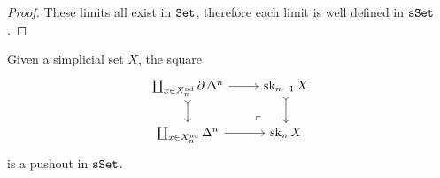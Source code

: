 \begin{proof}
    These limits all exist in \({\texttt{Set}}\), therefore each limit is well defined in
    \({\texttt{sSet}}\).
\end{proof}

\begin{proposition}
    \label{prop:filtration-attaching-cells}
    Given a simplicial set \(X\), the square
    \[
        \begin{tikzcd}
            \coprod_{x \in X_n^{\Nondeg}} \Bd \Delta^n
            \ar[rd, phantom, very near end, "\ulcorner"]
            \ar[r] \ar[d, tail]
            &\Sk_{n-1} X \ar[d, tail]
            \\
            \coprod_{x \in X_n^{\Nondeg}} \Delta^n
            \ar[r]
            &\Sk_n X
        \end{tikzcd}
    \]
    is a pushout in \({\texttt{sSet}}\).
\end{proposition}

